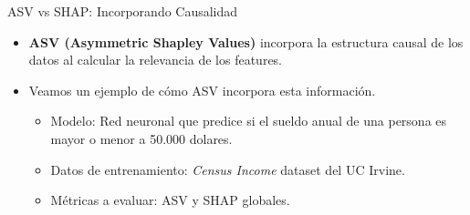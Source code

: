 \begin{frame}{ASV vs SHAP: Incorporando Causalidad}
    \begin{itemize}[<+- | alert@+>]
        \item \textbf{ASV (Asymmetric Shapley Values)} incorpora la estructura causal de los datos al calcular la relevancia de los features.
        \item Veamos un ejemplo de cómo ASV incorpora esta información.
        \begin{itemize}
            \item Modelo: Red neuronal que predice si el sueldo anual de una persona es mayor o menor a 50.000 dolares.
            \item Datos de entrenamiento: \textit{Census Income} dataset del UC Irvine. 
            \item Métricas a evaluar: ASV y SHAP globales. %

        \end{itemize}
        
    \end{itemize}
\end{frame}

